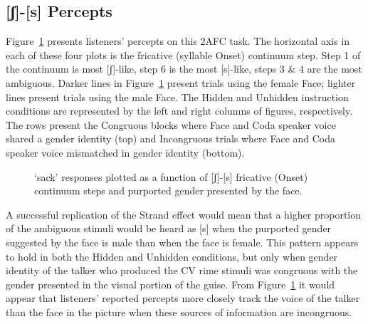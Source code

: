\documentclass[
  letterpaper,
  DIV=11,
  numbers=noendperiod]{scrartcl}
\begin{document}
\subsection{{[}ʃ{]}-{[}s{]} Percepts}\label{ux283-s-percepts}

Figure~\ref{fig-scurve} presents listeners' percepts on this 2AFC task.
The horizontal axis in each of these four plots is the fricative
(syllable Onset) continuum step. Step 1 of the continuum is most
{[}ʃ{]}-like, step 6 is the most {[}s{]}-like, steps 3 \& 4 are the most
ambiguous. Darker lines in Figure~\ref{fig-scurve} present trials using
the female Face; lighter lines present trials using the male Face. The
Hidden and Unhidden instruction conditions are represented by the left
and right columns of figures, respectively. The rows present the
Congruous blocks where Face and Coda speaker voice shared a gender
identity (top) and Incongruous trials where Face and Coda speaker voice
mismatched in gender identity (bottom).

\begin{figure}


\caption{\label{fig-scurve}`sack' responses plotted as a function of
{[}ʃ{]}-{[}s{]} fricative (Onset) continuum steps and purported gender
presented by the face.}

\end{figure}%

A successful replication of the Strand effect would mean that a higher
proportion of the ambiguous stimuli would be heard as {[}s{]} when the
purported gender suggested by the face is male than when the face is
female. This pattern appears to hold in both the Hidden and Unhidden
conditions, but only when gender identity of the talker who produced the
CV rime stimuli was congruous with the gender presented in the visual
portion of the guise. From Figure~\ref{fig-scurve} it would appear that
listeners' reported percepts more closely track the voice of the talker
than the face in the picture when these sources of information are
incongruous.
\end{document}
